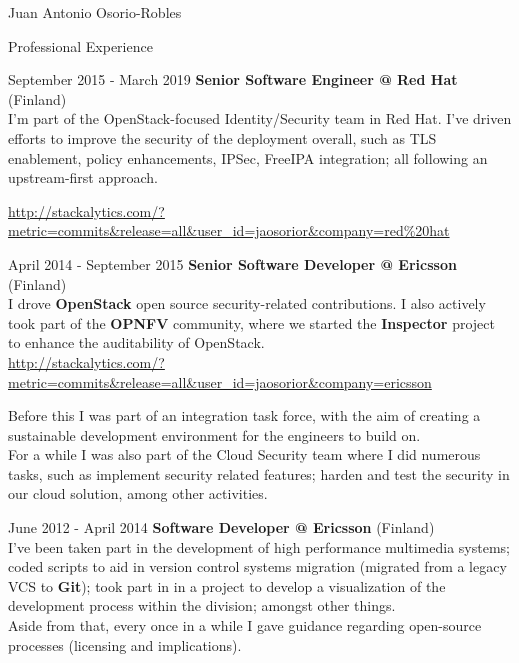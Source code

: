 \documentclass[english,10pt,letterpaper]{article}
\begin{document}
\begin{cv}{Juan Antonio Osorio-Robles}
\begin{cvlist}{Professional Experience}
		\item [September 2015 - March 2019]
            \textbf{Senior Software Engineer @ Red Hat} (Finland)\\
            I'm part of the OpenStack-focused Identity/Security team in Red
            Hat. I've driven efforts to improve the security of the deployment
            overall, such as TLS enablement, policy enhancements, IPSec,
            FreeIPA integration; all following an upstream-first approach.

            \url{http://stackalytics.com/?metric=commits&release=all&user_id=jaosorior&company=red\%20hat}

		\item [April 2014 - September 2015]
            \textbf{Senior Software Developer @ Ericsson} (Finland)\\
            I drove \textbf{OpenStack} open source security-related
            contributions. I also actively took part of the \textbf{OPNFV}
            community, where we started the \textbf{Inspector} project to
            enhance the auditability of OpenStack. \\

            \url{http://stackalytics.com/?metric=commits&release=all&user_id=jaosorior&company=ericsson}

            Before this I was part of an integration task force, with the
            aim of creating a sustainable development environment for
            the engineers to build on.\\

            For a while I was also part of the Cloud Security team where
            I did numerous tasks, such as implement security related
            features; harden and test the security in our cloud solution,
            among other activities.

		\item [June 2012 - April 2014]
            \textbf{Software Developer @ Ericsson} (Finland)\\
            I've been taken part in the development of high performance
            multimedia systems; coded scripts to aid in version control
            systems migration (migrated from a legacy VCS to \textbf{Git});
            took part in in a project to develop a visualization of the
            development process within the division; amongst other things.\\

            Aside from that, every once in a while I gave guidance
            regarding open-source processes (licensing and implications).


\end{cvlist}
\end{cv}
\end{document}
